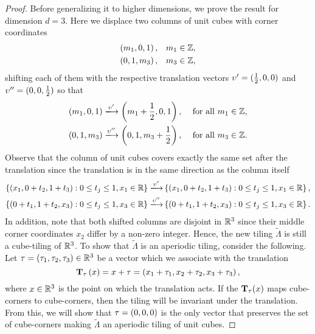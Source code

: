 \documentclass[../thesis.tex]{subfiles}
\begin{document}
\begin{proof}
Before generalizing it to higher dimensions, we prove the result for dimension $d=3$. Here we displace two columns of unit cubes with corner coordinates 
\begin{align*}
    \left(m_1,0,1\right),& \quad m_1 \in \mathbb{Z},\\
    \left(0,1,m_3\right),& \quad m_3 \in \mathbb{Z},
\end{align*}
shifting each of them with the respective translation vectors $\upsilon' = (\frac{1}{2},0,0)$ and $\upsilon'' = (0,0,\frac{1}{2})$ so that
\begin{align*}
    \bracMed{m_1,0,1} \xlongrightarrow[]{\upsilon'} \bracMed{m_1 + \frac{1}{2} ,0,1}, \quad  &\text{ for all } m_1 \in \Z,\\
    \bracMed{0,1,m_3} \xlongrightarrow[]{\upsilon''} \bracMed{0,1,m_3 + \frac{1}{2} },    \quad  &\text{ for all }  m_3 \in \Z.
\end{align*}
Observe that the column of unit cubes covers exactly the same set after the translation since the translation is in the same direction as the column itself 
\begin{align*}
    \braqMed{ \bracMed{x_1, 0+t_2,1+t_3} : 0 \leq t_j \leq 1, x_1\in\R} \xlongrightarrow[]{\upsilon'} & \braqMed{ \bracMed{x_1, 0+t_2,1+t_3} : 0 \leq t_j \leq 1, x_1\in\R},\\
    \braqMed{ \bracMed{0+t_1,1+t_2,x_3} : 0 \leq t_j \leq 1, x_3\in\R} \xlongrightarrow[]{\upsilon''} & \braqMed{ \bracMed{0+t_1,1+t_2,x_3} : 0 \leq t_j \leq 1, x_3\in\R}.
\end{align*}
In addition, note that both shifted columns are disjoint in $\mathbb{R}^3$ since their middle corner coordinates $x_2$ differ by a non-zero integer. Hence, the new tiling $\widetilde{\Lambda}$ is still a cube-tiling of $\mathbb{R}^3$. To show that $\widetilde{\Lambda}$ is an aperiodic tiling, consider the following. Let $\tau=(\tau_1,\tau_2,\tau_3)\in \mathbb{R}^3$ be a vector which we associate with the translation
\begin{equation*}
    \mathbf{T}_\tau \left(x\right) = x+\tau = \left(x_1+\tau_1, x_2+\tau_2, x_3+\tau_3\right),
\end{equation*}
where $x\in \mathbb{R}^3$ is the point on which the translation acts. If the $\mathbf{T}_\tau (x)$ maps cube-corners to cube-corners, then the tiling will be invariant under the translation. From this, we will show that $\tau=(0,0,0)$ is the only vector that preserves the set of cube-corners making $\widetilde{\Lambda}$ an aperiodic tiling of unit cubes. 


\end{proof}
\end{document}
